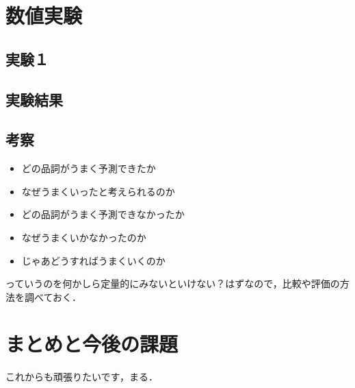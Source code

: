 \documentclass[twocolumn]{jarticle}
\begin{document}
\section{数値実験}
  \subsection{実験１}

  \subsection{実験結果}

  \subsection{考察}
  \begin{itemize}
    \item どの品詞がうまく予測できたか
    \item なぜうまくいったと考えられるのか
    \item どの品詞がうまく予測できなかったか
    \item なぜうまくいかなかったのか
    \item じゃあどうすればうまくいくのか
  \end{itemize}
  っていうのを何かしら定量的にみないといけない？はずなので，比較や評価の方法を調べておく．


\section{まとめと今後の課題}
これからも頑張りたいです，まる．




\end{document}
